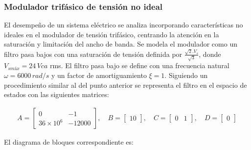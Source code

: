 \documentclass{article}
\begin{document}

\subsubsection{Modulador trifásico de tensión no ideal}

El desempeño de un sistema eléctrico se analiza incorporando características no ideales en el 
modulador de tensión trifásico, centrando la atención en la saturación y limitación del ancho de 
banda. Se modela el modulador como un filtro pasa bajos con una saturación de tensión definida por 
$\frac{\sqrt{2}.V_s}{\sqrt{3}}$, donde $V_{smáx} = 24\,Vca$ rms. El filtro pasa bajo se define con 
una frecuencia natural $\omega = 6000\,rad/s$ y un factor de amortiguamiento $\xi = 1$. Siguiendo un
procedimiento similar al del punto anterior se representa el filtro en el espacio de estados con 
las siguientes matrices: 

    \begin{align*}
    A = \begin{bmatrix}
    0 & -1 \\
    36 \times 10^6 & -12000
    \end{bmatrix}, \quad
    B = \begin{bmatrix}
    10
    \end{bmatrix}, \quad
    C = \begin{bmatrix}
    0 & 1
    \end{bmatrix}, \quad
    D = \begin{bmatrix}
    0
    \end{bmatrix}
\end{align*}

El diagrama de bloques correspondiente es:
\end{document}
